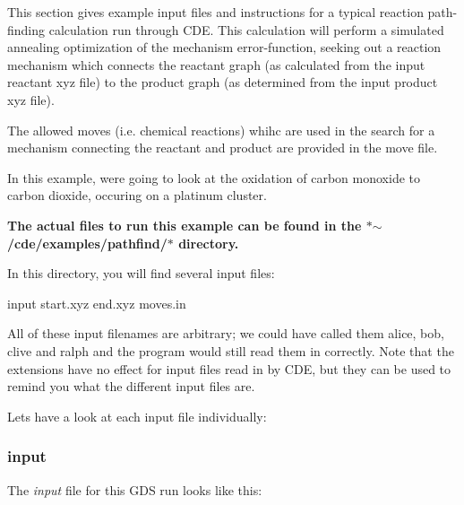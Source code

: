This section gives example input files and instructions for a typical reaction path-\/finding calculation run through C\+DE. This calculation will perform a simulated annealing optimization of the mechanism error-\/function, seeking out a reaction mechanism which connects the reactant graph (as calculated from the input reactant xyz file) to the product graph (as determined from the input product xyz file).

The allowed moves (i.\+e. chemical reactions) whihc are used in the search for a mechanism connecting the reactant and product are provided in the move file.

In this example, we\textquotesingle{}re going to look at the oxidation of carbon monoxide to carbon dioxide, occuring on a platinum cluster.

{\bfseries The actual files to run this example can be found in the $\ast$$\sim$/cde/examples/pathfind/$\ast$ directory.}

In this directory, you will find several input files\+: \begin{DoxyVerb}input
start.xyz
end.xyz
moves.in
\end{DoxyVerb}


All of these input filenames are arbitrary; we could have called them alice, bob, clive and ralph and the program would still read them in correctly. Note that the extensions have no effect for input files read in by C\+DE, but they can be used to remind you what the different input files are.

Let\textquotesingle{}s have a look at each input file individually\+:

\subsubsection*{input}

The {\itshape input} file for this G\+DS run looks like this\+:

